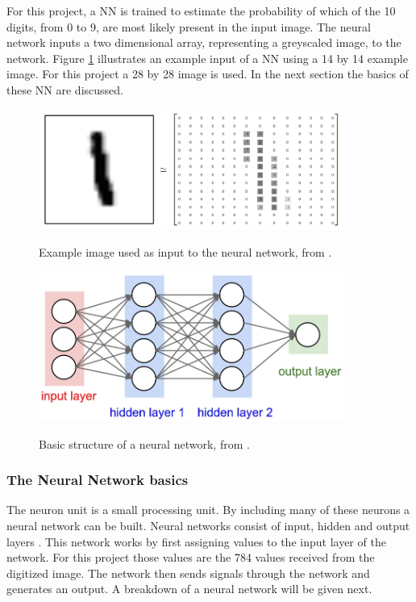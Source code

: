 For this project, a NN is trained to estimate the probability of which of the 10 digits, from 0 to 9, are most likely present in the input image. The neural network inputs a two dimensional array, representing a greyscaled image, to the network. Figure \ref{fig:mnist} illustrates an example input of a NN using a 14 by 14 example image. For this project a 28 by 28 image is used. In the next section the basics of these NN are discussed.

\begin{figure}[b]
  \centering
  \includegraphics[width=10cm]{MNIST}\\
  \caption{Example image used as input to the neural network, from \citet{tensor2017}.}
  \label{fig:mnist}
\end{figure}

\begin{figure}
  \centering
  \includegraphics[width=10cm]{NN}\\
  \caption{Basic structure of a neural network, from \citet{karpathy2017}.} 
  \label{fig:nn}
\end{figure}

\subsubsection{The Neural Network basics}

The neuron unit is a small processing unit. By including many of these neurons a neural network can be built. Neural networks consist of input, hidden and output layers \citep{MichealN2015}. This network works by first assigning values to the input layer of the network. For this project those values are the 784 values received from the digitized image. The network then sends signals through the network and generates an output. A breakdown of a neural network will be given next.

